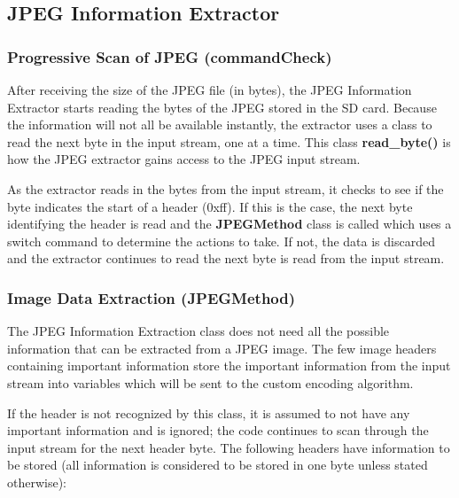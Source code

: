 \subsection{JPEG Information Extractor}

\subsubsection{Progressive Scan of JPEG (commandCheck)}

After receiving the size of the JPEG file (in bytes), 
the JPEG Information Extractor starts reading the bytes of the JPEG stored in the SD card. 
Because the information will not all be available instantly, 
the extractor uses a class to read the next byte in the input stream, one at a time. This class \textbf{read\_byte()} is 
how the JPEG extractor gains access to the JPEG input stream. 

As the extractor reads in the bytes from the input stream, it checks to see if the byte indicates the start of a header (0xff). 
If this is the case, the next byte identifying the header is read and the \textbf{JPEGMethod} class is 
called which uses a switch command to determine the actions to take. 
If not, the data is discarded and the extractor continues to read the next byte is read from the input stream. 

\subsubsection{Image Data Extraction (JPEGMethod)}

The JPEG Information Extraction class does not need all the possible information that can be extracted from a JPEG image. 
The few image headers containing important information store the important information from the input stream into 
variables which will be sent to the custom encoding algorithm. 

If the header is not recognized by this class, 
it is assumed to not have any important information and is ignored; 
the code continues to scan through the input stream for the next header byte. 
The following headers have  information to be stored (all information is considered to be stored in one byte unless stated otherwise):


